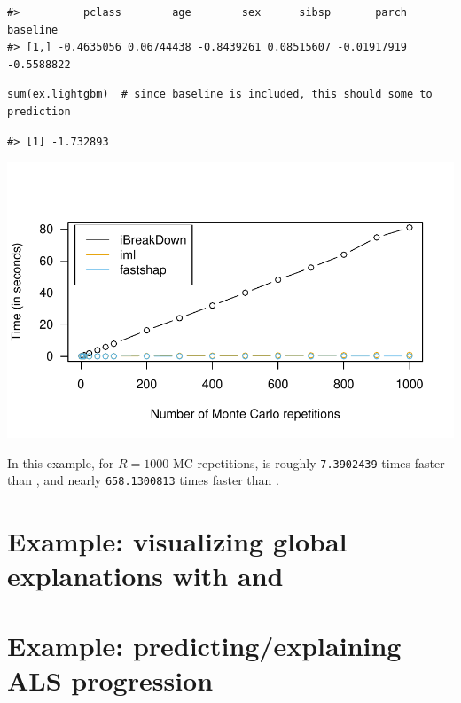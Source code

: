 \begin{verbatim}
#>          pclass        age        sex      sibsp       parch   baseline
#> [1,] -0.4635056 0.06744438 -0.8439261 0.08515607 -0.01917919 -0.5588822
\end{verbatim}

\begin{verbatim}
sum(ex.lightgbm)  # since baseline is included, this should some to prediction
\end{verbatim}

\begin{verbatim}
#> [1] -1.732893
\end{verbatim}

\includegraphics[width=1\linewidth]{greenwell_files/figure-latex/ex-titanic-benchmark-1}

In this example, for \(R = 1000\) MC repetitions,  is roughly \texttt{7.3902439} times faster than , and nearly \texttt{658.1300813} times faster than .

\hypertarget{example-visualizing-global-explanations-with-and}{%
\section{\texorpdfstring{Example: visualizing global explanations with  and }{Example: visualizing global explanations with  and }}\label{example-visualizing-global-explanations-with-and}}

\hypertarget{example-predictingexplaining-als-progression}{%
\section{Example: predicting/explaining ALS progression}\label{example-predictingexplaining-als-progression}}

